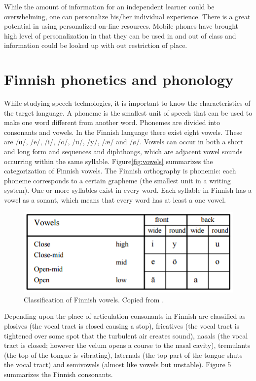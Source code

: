 \documentclass[11pt,a4paper,oneside,article]{memoir}
\begin{document}
While the amount of information for an independent learner could be overwhelming, one can personalize his/her individual experience. There is a great potential in using personalized on-line resources. Mobile phones have brought high level of personalization in that they can be used in and out of class and information could be looked up with out restriction of place.

\section{Finnish phonetics and phonology}
While studying speech technologies, it is important to know the characteristics of the target language. A phoneme is the smallest unit of speech that can be used to make one word different from another word. Phonemes are divided into consonants and vowels. In the Finnish language there exist eight vowels. These are  /ɑ/, /e/, /i/, /o/, /u/, /y/, /æ/ and /ø/. Vowels can occur in both a short and long form and sequences and diphthongs, which are adjacent vowel sounds occurring within the same syllable. \cite{silen} Figure\vref{fig:vowels} summarizes the categorization of Finnish vowels.
The Finnish orthography is phonemic: each phoneme corresponds to a certain grapheme (the smallest unit in a writing system). One or more syllables exist in every word. Each syllable in Finnish has a vowel as a sonant, which means that every word has at least a one vowel. \cite{silen}                                            

\begin{figure}[h]
  \includegraphics[width=12cm]{vowels}
  \caption{Classification of Finnish vowels. Copied from \cite{hut}.}
  \label{fig:vowels}
\end{figure}

Depending upon the place of articulation consonants in Finnish are classified as plosives (the vocal tract is closed causing a stop), fricatives (the vocal tract is tightened over some spot that the turbulent air creates sound), nasals (the vocal tract is closed; however the velum opens a course to the nasal cavity), tremulants (the top of the tongue is vibrating), laternals (the top part of the tongue shuts the vocal tract) and semivowels (almost like vowels but unstable). Figure 5 summarizes the Finnish consonants. \cite{hut}
\end{document}
